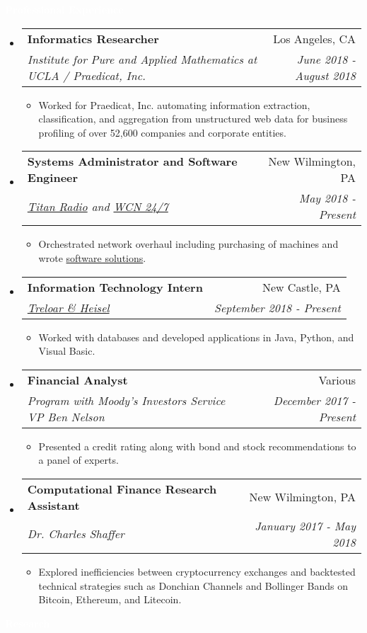 \documentclass[letterpaper,11pt]{article}
\makeatletter
\newcommand{\resitem}[1]{\item #1 \vspace{-2pt}}
\newcommand{\resheading}[1]{{\large \colorbox{electricpurple}{\begin{minipage}{\textwidth}{\textbf{#1 \vphantom{p\^{E}}}}\end{minipage}}}}
\newcommand{\ressubheading}[4]{
	\begin{tabular*}{7.0in}{l@{\extracolsep{\fill}}r}
		\textbf{#1} & #2 \\
		\textit{#3} & \textit{#4} \\
	\end{tabular*}\vspace{-6pt}}
\makeatother
\begin{document}
	\resheading{\textcolor{white}{Professional Experience}}
	\begin{itemize}[topsep=3pt, itemsep=1pt]
		\item
		\ressubheading{Informatics Researcher}{Los Angeles, CA}{Institute for Pure and Applied Mathematics at UCLA / Praedicat, Inc.}{June 2018 -August 2018}
		\begin{itemize}[topsep=3pt, itemsep=1pt]
			\resitem{Worked for Praedicat, Inc. automating information extraction, classification, and aggregation from unstructured web data for business profiling of over 52,600 companies and corporate entities.}
		\end{itemize}
		\item
		\ressubheading{Systems Administrator and Software Engineer}{New Wilmington, PA}{\href{http://titanradio.net/}{Titan Radio} and \href{https://www.wcn247.com/}{WCN 24/7}}{May 2018 - Present}
		\begin{itemize}[topsep=3pt, itemsep=1pt]
			\resitem{Orchestrated network overhaul including purchasing of machines and wrote \href{https://github.com/alexandermichels/WeatherWaves}{software solutions}.}
		\end{itemize}
		\item
		\ressubheading{Information Technology Intern}{New Castle, PA}{\href{http://treloaronline.com/}{Treloar \& Heisel}}{September 2018 - Present}
		\begin{itemize}[topsep=3pt, itemsep=1pt]
			\resitem{Worked with databases and developed applications in Java, Python, and Visual Basic.}
		\end{itemize}
		\item
		\ressubheading{Financial Analyst}{Various}{Program with Moody’s Investors Service VP Ben Nelson}{December 2017 - Present}
		\begin{itemize}[topsep=3pt, itemsep=1pt]
			\resitem{Presented a credit rating along with bond and stock recommendations to a panel of experts.}
		\end{itemize}
		\item
		\ressubheading{Computational Finance Research Assistant}{New Wilmington, PA}{Dr. Charles Shaffer}{January 2017 - May 2018}
		\begin{itemize}[topsep=3pt, itemsep=1pt]
			\resitem{Explored inefficiencies between cryptocurrency exchanges and backtested technical strategies such as Donchian Channels and Bollinger Bands on Bitcoin, Ethereum, and Litecoin.}
		\end{itemize}
		
	\end{itemize}
	\resheading{\textcolor{white}{Research}}
	
\end{document}

